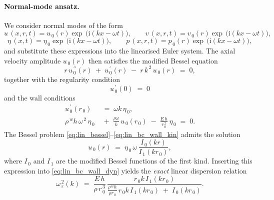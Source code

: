 \documentclass[alpha-refs, 12pt]{wiley-article}
\newcommand{\ui}{\mathrm{i}}
\newcommand{\eps}{\varepsilon}
\begin{document}
\paragraph{Normal-mode ansatz.} We consider normal modes of the form
\begin{equation*}
  u\,\left(x,r,t\right)=u_{\,0}\left(r\right)\exp\,\bigl(\ui\left(kx-\omega t\right)\bigr),\qquad
  v\,\left(x,r,t\right)=v_{\,0}\left(r\right)\exp\,\bigl(\ui\left(kx-\omega t\right)\bigr),
\end{equation*}
\begin{equation*}
  \eta\,\left(x,t\right)=\eta_{\,0}\exp\,\bigl(\ui\left(kx-\omega t\right)\bigr),\qquad
  p\,\left(x,r,t\right)=p_{\,0}\left(r\right)\exp\,\bigl(\ui\left(kx-\omega t\right)\bigr),
\end{equation*}
and substitute these expressions into the linearised Euler system. The axial velocity amplitude $u_{\,0}\left(r\right)$ then satisfies the modified Bessel equation
\begin{equation}\label{eq:lin_bessel}
  r\,u_{\,0}^{\,\prime\prime}\left(r\right)\;+\;u_{\,0}^{\,\prime}\left(r\right)\;-\;r\,k^{\,2}\,
  u_{\,0}\left(r\right)\;=\;0,
\end{equation}
together with the regularity condition
\begin{equation}\label{eq:lin_bc_centre}
  u_{\,0}^{\,\prime}\left(0\right)\;=\;0
\end{equation}
and the wall conditions
\begin{align}
  u_{\,0}^{\,\prime}\left(r_{\,0}\right) & \;=\;\omega k\,\eta_{\,0}, \label{eq:lin_bc_wall_kin}\\
  \rho^{\,w}h\,\omega^{\,2}\,\eta_{\,0} & \;+\;\frac{\rho\omega}{k}\,u_{\,0}\left(r_{\,0}\right)
  \;-\;\frac{E\,h}{r_{\,0}^{\,2}}\,\eta_{\,0}\;=\;0.
  \label{eq:lin_bc_wall_dyn}
\end{align}
The Bessel problem \eqref{eq:lin_bessel}--\eqref{eq:lin_bc_wall_kin} admits the solution
\[
  u_{\,0}\left(r\right)\;=\;\eta_{\,0}\,\omega\,
  \frac{I_{\,0}\left(kr\right)}{I_{\,1}\left(kr_{\,0}\right)},
\]
where $I_{\,0}$ and $I_{\,1}$ are the modified Bessel functions of the first kind.  Inserting this expression into \eqref{eq:lin_bc_wall_dyn} yields the \emph{exact} linear dispersion relation
\begin{equation}\label{eq:disp_euler}
  \omega_{\,\eps}^{\,2}\left(k\right)\;=\;
  \frac{E\,h}{\rho\,r_{\,0}^{\,3}}\,
  \frac{r_{\,0}k\,I_{\,1}\left(kr_{\,0}\right)}
       {\displaystyle\frac{\rho^{\,w}h}{\rho r_{\,0}}\,
       r_{\,0}k\,I_{\,1}\left(kr_{\,0}\right)\;+\;I_{\,0}\left(kr_{\,0}\right)}.
\end{equation}
\end{document}

